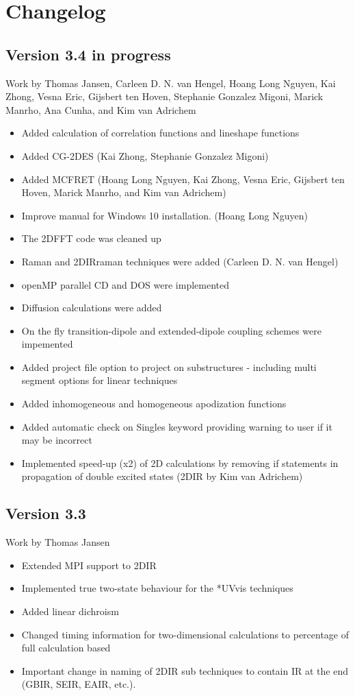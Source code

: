 \section{Changelog}
\subsection{Version 3.4 in progress}
{\small Work by Thomas Jansen, Carleen D. N. van Hengel, Hoang Long Nguyen, Kai Zhong, Vesna Eric, Gijsbert ten Hoven, Stephanie Gonzalez Migoni, Marick Manrho, Ana Cunha, and Kim van Adrichem}
\begin{itemize}
\item Added calculation of correlation functions and lineshape functions
\item Added CG-2DES (Kai Zhong, Stephanie Gonzalez Migoni)
\item Added MCFRET (Hoang Long Nguyen, Kai Zhong, Vesna Eric, Gijsbert ten Hoven, Marick Manrho, and Kim van Adrichem)
\item Improve manual for Windows 10 installation. (Hoang Long Nguyen)
\item The 2DFFT code was cleaned up
\item Raman and 2DIRraman techniques were added (Carleen D. N. van Hengel)
\item openMP parallel CD and DOS were implemented
\item Diffusion calculations were added
\item On the fly transition-dipole and extended-dipole coupling schemes were impemented
\item Added project file option to project on substructures - including multi segment options for linear techniques
\item Added inhomogeneous and homogeneous apodization functions
\item Added automatic check on Singles keyword providing warning to user if it may be incorrect
\item Implemented speed-up (x2) of 2D calculations by removing if statements in propagation of double excited states (2DIR by Kim van Adrichem)
\end{itemize}
\subsection{Version 3.3}
{\small Work by Thomas Jansen}
\begin{itemize}
\item Extended MPI support to 2DIR
\item Implemented true two-state behaviour for the *UVvis techniques
\item Added linear dichroism
\item Changed timing information for two-dimensional calculations to percentage of full calculation based
\item Important change in naming of 2DIR sub techniques to contain IR at the end (GBIR, SEIR, EAIR, etc.).
\end{itemize}
